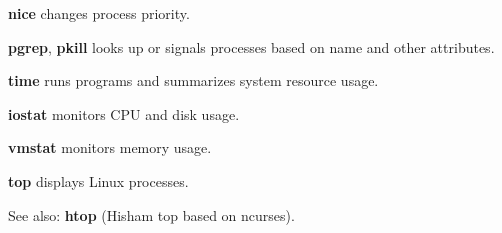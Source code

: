 \begin{compactenum}
	\item [\cmdvar] \textbf{nice} changes process priority.
\end{compactenum}

\begin{compactenum}
	\item [\cmdvar] \textbf{pgrep}, \textbf{pkill} looks up or signals 
processes based on name and other attributes.
\end{compactenum}

\begin{compactenum}
	\item [\cmdvar] \textbf{time} runs programs and summarizes system resource usage. 
\end{compactenum}

\begin{compactenum}
	\item [\cmdvar] \textbf{iostat} monitors CPU and disk usage.
	\item [\cmdvar] \textbf{vmstat} monitors memory usage.
	\item [\cmdvar] \textbf{top} displays Linux processes.
	\item [\cmdvar] See also: \textbf{htop} (Hisham top based on ncurses).
\end{compactenum}
